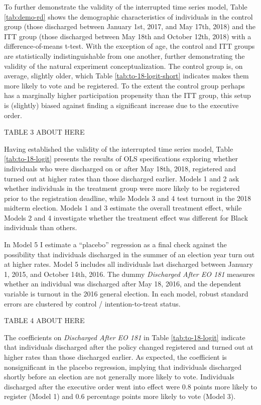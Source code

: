 \documentclass[
  12pt,
]{article}
\begin{document}
To further demonstrate the validity of the interrupted time series model, Table \ref{tab:demo-rd} shows the demographic characteristics of individuals in the control group (those discharged between January 1st, 2017, and May 17th, 2018) and the ITT group (those discharged between May 18th and October 12th, 2018) with a difference-of-means t-test. With the exception of age, the control and ITT groups are statistically indistinguishable from one another, further demonstrating the validity of the natural experiment conceptualization. The control group is, on average, slightly older, which Table \ref{tab:to-18-logit-short} indicates makes them more likely to vote and be registered. To the extent the control group perhaps has a marginally higher participation propensity than the ITT group, this setup is (slightly) biased against finding a significant increase due to the executive order.

TABLE 3 ABOUT HERE

Having established the validity of the interrupted time series model, Table \ref{tab:to-18-logit} presents the results of OLS specifications exploring whether individuals who were discharged on or after May 18th, 2018, registered and turned out at higher rates than those discharged earlier. Models 1 and 2 ask whether individuals in the treatment group were more likely to be registered prior to the registration deadline, while Models 3 and 4 test turnout in the 2018 midterm election. Models 1 and 3 estimate the overall treatment effect, while Models 2 and 4 investigate whether the treatment effect was different for Black individuals than others.

In Model 5 I estimate a ``placebo'' regression as a final check against the possibility that individuals discharged in the summer of an election year turn out at higher rates. Model 5 includes all individuals last discharged between January 1, 2015, and October 14th, 2016. The dummy \emph{Discharged After EO 181} measures whether an individual was discharged after May 18, 2016, and the dependent variable is turnout in the 2016 general election. In each model, robust standard errors are clustered by control / intention-to-treat status.

TABLE 4 ABOUT HERE

The coefficients on \emph{Discharged After EO 181} in Table \ref{tab:to-18-logit} indicate that individuals discharged after the policy changed registered and turned out at higher rates than those discharged earlier. As expected, the coefficient is nonsignificant in the placebo regression, implying that individuals discharged shortly before an election are not generally more likely to vote. Individuals discharged after the executive order went into effect were 0.8 points more likely to register (Model 1) and 0.6 percentage points more likely to vote (Model 3).
\end{document}
